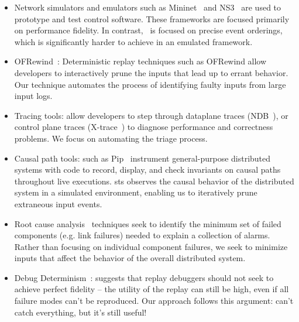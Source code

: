 \begin{itemize}
\item Network simulators and emulators such as
Mininet~\cite{Lantz:2010:NLR:1868447.1868466} and NS3~\cite{ns3}
are used to prototype and test control software. These frameworks are focused
primarily on performance fidelity. In contrast, \projectname~is focused on
precise event orderings, which is significantly harder to achieve in an
emulated framework.
\item OFRewind~\cite{ofrewind}: Deterministic replay techniques such as OFRewind allow developers to interactively prune the inputs that lead up to errant behavior. Our technique automates the process of identifying faulty inputs from large input logs.
\item Tracing tools: allow developers to step through dataplane traces (NDB~\cite{handigol2012debugger}), or control plane traces (X-trace~\cite{fonseca2007x}) to diagnose performance and correctness problems. We focus on automating the triage process.
\item Causal path tools: such as Pip~\cite{pip} instrument general-purpose distributed systems
with code to record, display, and check invariants on causal paths throughout
live executions. sts observes the causal behavior of the
distributed system in a simulated environment, enabling us to iteratively prune extraneous input events.
\item Root cause analysis~\cite{577079} techniques seek to identify the minimum set of failed
components (e.g. link failures) needed to explain a collection of alarms. Rather than
focusing on individual component failures, we seek to minimize inputs that affect the behavior
of the overall distributed system.
\item Debug Determinism~\cite{zamfir2011debug}: suggests that replay debuggers should not seek to achieve perfect fidelity -- the utility of the replay can still be high, even if all failure modes can't be reproduced. Our approach follows this argument: can't catch everything, but it's still useful!
\end{itemize}

